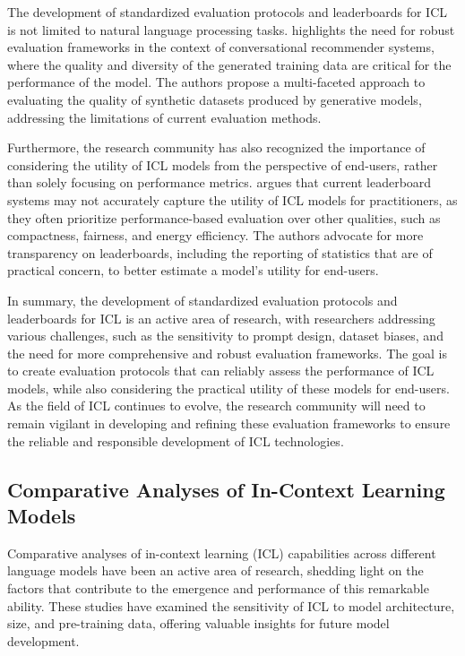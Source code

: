 \documentclass[11pt]{article}
\begin{document}
The development of standardized evaluation protocols and leaderboards for ICL is not limited to natural language processing tasks. \cite{ref294} highlights the need for robust evaluation frameworks in the context of conversational recommender systems, where the quality and diversity of the generated training data are critical for the performance of the model. The authors propose a multi-faceted approach to evaluating the quality of synthetic datasets produced by generative models, addressing the limitations of current evaluation methods.

Furthermore, the research community has also recognized the importance of considering the utility of ICL models from the perspective of end-users, rather than solely focusing on performance metrics. \cite{ref295} argues that current leaderboard systems may not accurately capture the utility of ICL models for practitioners, as they often prioritize performance-based evaluation over other qualities, such as compactness, fairness, and energy efficiency. The authors advocate for more transparency on leaderboards, including the reporting of statistics that are of practical concern, to better estimate a model's utility for end-users.

In summary, the development of standardized evaluation protocols and leaderboards for ICL is an active area of research, with researchers addressing various challenges, such as the sensitivity to prompt design, dataset biases, and the need for more comprehensive and robust evaluation frameworks. The goal is to create evaluation protocols that can reliably assess the performance of ICL models, while also considering the practical utility of these models for end-users. As the field of ICL continues to evolve, the research community will need to remain vigilant in developing and refining these evaluation frameworks to ensure the reliable and responsible development of ICL technologies.

\subsection{Comparative Analyses of In-Context Learning Models}

Comparative analyses of in-context learning (ICL) capabilities across different language models have been an active area of research, shedding light on the factors that contribute to the emergence and performance of this remarkable ability. These studies have examined the sensitivity of ICL to model architecture, size, and pre-training data, offering valuable insights for future model development.
\end{document}

